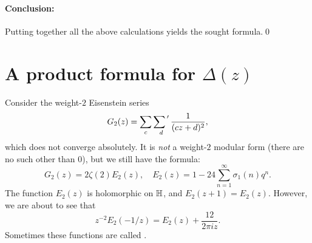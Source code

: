 \paragraph{Conclusion:} Putting together all the above calculations yields the sought formula.\qed

\section{A product formula for \texorpdfstring{$\Delta(z)$}{Delta(z)}}
\label{sec:a-product-formula-for-Delta}

Consider the weight-$2$ Eisenstein series
\[
G_2(z)=\sum_c\sumprime_d \frac{1}{(cz+d)^2},
\]
which does not converge absolutely. It is \emph{not} a weight-$2$ modular form (there are no such other than $0$), but we still have the formula:
\[
G_2(z)=2\zeta(2)E_2(z),\quad E_2(z)=1-24\sum_{n=1}^\infty \sigma_1(n)q^n.
\]
The function $E_2(z)$ is holomorphic on $\mathbb{H}$, and $E_2(z+1)=E_2(z)$. However, we are about to see that
\[
z^{-2}E_2(-1/z) = E_2(z)+\frac{12}{2\pi i z}.
\]
Sometimes these functions are called .

